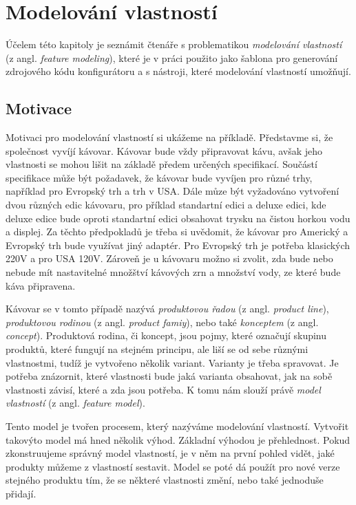 \chapter{Modelování vlastností}

Účelem této kapitoly je seznámit čtenáře s problematikou \textit{modelování vlastností} (z angl. \textit{feature modeling}), které je v práci použito jako šablona pro generování zdrojového kódu konfigurátoru a s nástroji, které modelování vlastností umožňují.

\section{Motivace}

Motivaci pro modelování vlastností si ukážeme na příkladě. Představme si, že společnost vyvíjí kávovar. Kávovar bude vždy připravovat kávu, avšak jeho vlastnosti se mohou lišit na základě předem určených specifikací. Součástí specifikace může být požadavek, že kávovar bude vyvíjen pro různé trhy, například pro Evropský trh a trh v USA. Dále můze být vyžadováno vytvoření dvou různých edic kávovaru, pro příklad standartní edici a deluxe edici, kde deluxe edice bude oproti standartní edici obsahovat trysku na čistou horkou vodu a displej. Za těchto předpokladů je třeba si uvědomit, že kávovar pro Americký a Evropský trh bude využívat jiný adaptér. Pro Evropský trh je potřeba klasických 220V a pro USA 120V. Zároveň je u kávovaru možno si zvolit, zda bude nebo nebude mít nastavitelné množštví kávových zrn a množství vody, ze které bude káva připravena.

Kávovar se v tomto případě nazývá \textit{produktovou řadou} (z angl. \textit{product line}), \textit{produktovou rodinou} (z angl. \textit{product famiy}), nebo také \textit{konceptem} (z angl. \textit{concept}). Produktová rodina, či koncept, jsou pojmy, které označují skupinu produktů, které fungují na stejném principu, ale liší se od sebe různými vlastnostmi, tudíž je vytvořeno několik variant. Varianty je třeba spravovat. Je potřeba znázornit, které vlastnosti bude jaká varianta obsahovat, jak na sobě vlastnosti závisí, které a zda jsou potřeba. K tomu nám slouží právě \textit{model vlastností} (z angl. \textit{feature model}).

Tento model je tvořen procesem, který nazýváme modelování vlastností. Vytvořit takovýto model má hned několik výhod. Základní výhodou je přehlednost. Pokud zkonstruujeme správný model vlastností, je v něm na první pohled vidět, jaké produkty můžeme z vlastností sestavit. Model se poté dá použít pro nové verze stejného produktu tím, že se některé vlastnosti změní, nebo také jednoduše přidají.

